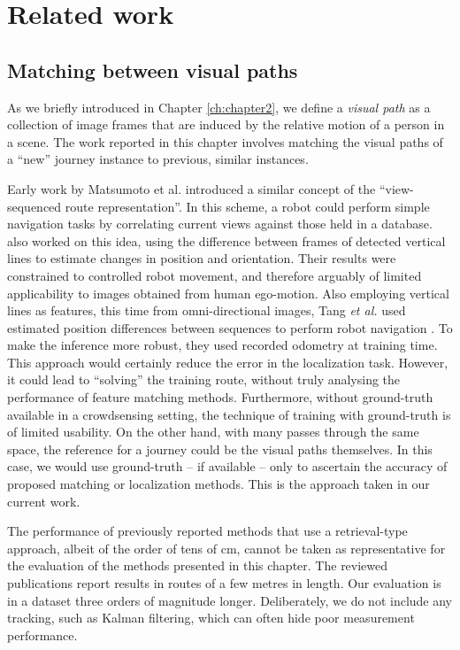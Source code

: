 \section{Related work}
\label{sec:retrieval}

\subsection{Matching between visual paths} 
\label{subsec:early_works}
 
As we briefly introduced in Chapter \ref{ch:chapter2}, we define a {\em visual path} as a collection of image frames that are induced by the relative motion of a person in a scene. The work reported in this chapter involves matching the visual paths of a ``new'' journey instance to previous, similar instances. 

Early work by Matsumoto et al. \cite{Matsumoto1996} introduced a similar concept of the ``view-sequenced route representation''.  In this scheme,  a robot could perform simple navigation tasks by correlating current views against those held in a database. \citet{Ohno1996} also worked on this idea, using the difference between frames of detected vertical lines to estimate changes in position and orientation. Their results were constrained to controlled robot movement, and therefore arguably of limited applicability to images obtained from human ego-motion. Also employing vertical lines as features, this time from omni-directional images, Tang {\it et al.} used estimated position differences between sequences to perform  robot navigation \cite{Tang2001}. To make the inference more robust, they used recorded odometry at training time. This approach would certainly reduce the error in the localization task. However, it could lead to ``solving'' the training  route, without truly analysing the performance of feature matching methods. Furthermore, without ground-truth available in a crowdsensing setting, the technique of training with ground-truth is of limited usability.  On the other hand, with many passes through the same space, the reference for a journey could be the visual paths themselves. In this case, we would use ground-truth -- if available -- only to ascertain the accuracy of proposed matching or localization methods. This is the approach taken in our current work.

The performance of previously reported methods that use a retrieval-type approach, albeit of the order of tens of cm, cannot be taken as representative for the evaluation of the methods presented in this chapter. The reviewed publications report results in routes of a few metres in length. Our evaluation is in a dataset three orders of magnitude longer.  Deliberately, we do not include any tracking, such as Kalman filtering, which can often hide poor measurement performance. 


